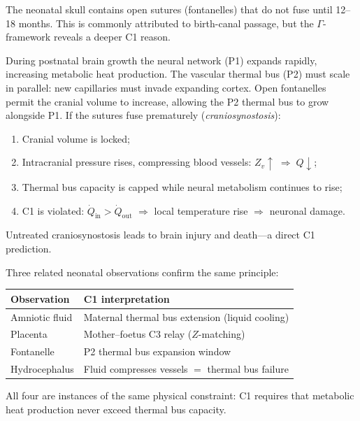 \documentclass[aps,pre,twocolumn,superscriptaddress,floatfix]{revtex4-2}
\begin{document}
\begin{remark}
\label{rem:fontanelle}
The neonatal skull contains open sutures
(fontanelles) that do not fuse until 12--18 months.
This is commonly attributed to birth-canal passage,
but the $\Gamma$-framework reveals a deeper C1 reason.

During postnatal brain growth the neural network
(P1) expands rapidly, increasing metabolic heat
production.
The vascular thermal bus (P2) must scale in
parallel: new capillaries must invade expanding
cortex.
Open fontanelles permit the cranial volume to
increase, allowing the P2 thermal bus to grow
alongside P1.
If the sutures fuse prematurely
(\emph{craniosynostosis}):
\begin{enumerate}
  \item Cranial volume is locked;
  \item Intracranial pressure rises,
    compressing blood vessels:
    $Z_v \uparrow \;\Rightarrow\; Q \downarrow$;
  \item Thermal bus capacity is capped while
    neural metabolism continues to rise;
  \item C1 is violated: $\dot{Q}_{\text{in}}
    > \dot{Q}_{\text{out}}$ $\Rightarrow$
    local temperature rise $\Rightarrow$
    neuronal damage.
\end{enumerate}
Untreated craniosynostosis leads to brain injury and
death---a direct C1 prediction.

Three related neonatal observations confirm the
same principle:
\begin{center}
\begin{tabular}{ll}
\toprule
Observation & C1 interpretation \\
\midrule
Amniotic fluid &
  Maternal thermal bus extension (liquid cooling) \\
Placenta &
  Mother--foetus C3 relay ($Z$-matching) \\
Fontanelle &
  P2 thermal bus expansion window \\
Hydrocephalus &
  Fluid compresses vessels $=$ thermal bus failure \\
\bottomrule
\end{tabular}
\end{center}
All four are instances of the same physical
constraint: C1 requires that metabolic heat
production never exceed thermal bus capacity.
\end{remark}
\end{document}
